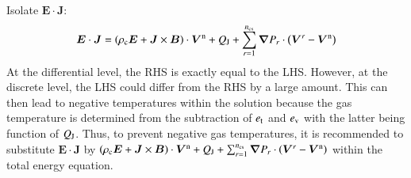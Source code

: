 \documentclass{warpdoc}
\renewcommand{\vec}[1]{\bm{#1}}
\begin{document}
%
Isolate $\vec{E}\cdot\vec{J}$:
%
\begin{equation}
\vec{E} \cdot \vec{J}
=
 \left(\rho_{\rm c} \vec{E} + \vec{J}\times\vec{B} \right)\cdot \vec{V}^{\rm n}
+ Q_{\rm J} 
+  \sum_{r=1}^{n_{\rm cs}} \vec{\nabla} P_r \cdot \left(\vec{V}^r-\vec{V}^{\rm n}\right) 
\end{equation}
%
At the differential level, the RHS is exactly equal to the LHS. However, at the discrete level, the LHS could differ from the RHS by a large amount. This can then lead to negative temperatures within the solution because the gas temperature is determined from the subtraction of $e_{\rm t}$ and $e_{\rm v}$ with the latter being function of $Q_{\rm J}$. Thus, to prevent negative gas temperatures, it is recommended to substitute $\vec{E}\cdot\vec{J}$ by $\left(\rho_{\rm c} \vec{E} + \vec{J}\times\vec{B} \right)\cdot \vec{V}^{\rm n}
+ Q_{\rm J} +  \sum_{r=1}^{n_{\rm cs}} \vec{\nabla} P_r \cdot \left(\vec{V}^r-\vec{V}^{\rm n}\right)$ within the total energy equation.


 

  
  
\end{document}

